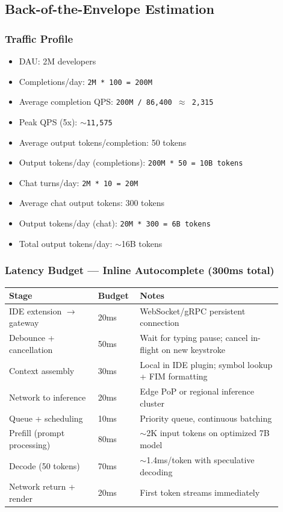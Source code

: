 \subsection*{Back-of-the-Envelope Estimation}

\subsubsection*{Traffic Profile}

\begin{itemize}
  \item DAU: 2M developers
  \item Completions/day: \texttt{2M * 100 = 200M}
  \item Average completion QPS: \texttt{200M / 86,400 $\approx$ 2,315}
  \item Peak QPS (5x): \texttt{$\sim$11,575}
  \item Average output tokens/completion: 50 tokens
  \item Output tokens/day (completions): \texttt{200M * 50 = 10B tokens}
  \item Chat turns/day: \texttt{2M * 10 = 20M}
  \item Average chat output tokens: 300 tokens
  \item Output tokens/day (chat): \texttt{20M * 300 = 6B tokens}
  \item Total output tokens/day: $\sim$16B tokens
\end{itemize}

\subsubsection*{Latency Budget --- Inline Autocomplete (300ms total)}

\begin{tabular}{|p{0.30\linewidth}|p{0.12\linewidth}|p{0.48\linewidth}|}
\hline
\textbf{Stage} & \textbf{Budget} & \textbf{Notes} \\
\hline
IDE extension $\rightarrow$ gateway & 20ms & WebSocket/gRPC persistent connection \\
\hline
Debounce + cancellation & 50ms & Wait for typing pause; cancel in-flight on new keystroke \\
\hline
Context assembly & 30ms & Local in IDE plugin; symbol lookup + FIM formatting \\
\hline
Network to inference & 20ms & Edge PoP or regional inference cluster \\
\hline
Queue + scheduling & 10ms & Priority queue, continuous batching \\
\hline
Prefill (prompt processing) & 80ms & $\sim$2K input tokens on optimized 7B model \\
\hline
Decode (50 tokens) & 70ms & $\sim$1.4ms/token with speculative decoding \\
\hline
Network return + render & 20ms & First token streams immediately \\
\hline
\end{tabular}

